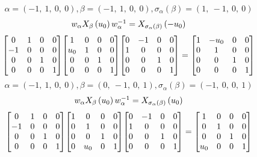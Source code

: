 \documentclass[11pt]{article}
\theoremstyle{definition}
\begin{document}
\[
\alpha = \left( -1, \  1, \  0, \  0\right), \beta = \left( -1, \  1, \  0, \  0\right), \sigma_{\alpha}(\beta) = \left( 1, \  -1, \  0, \  0\right)
\]
\[
\scaletoalign{\textwidth}{w_{\alpha} X_{\beta}\left(u_{0}\right) w_{\alpha}^{-1} = X_{\sigma_{\alpha}\left(\beta\right)}\left(- u_{0}\right)}
\]
\[
\scaletoalign{\textwidth}{{\left[\begin{matrix}0 & 1 & 0 & 0\\-1 & 0 & 0 & 0\\0 & 0 & 1 & 0\\0 & 0 & 0 & 1\end{matrix}\right]} {\left[\begin{matrix}1 & 0 & 0 & 0\\u_{0} & 1 & 0 & 0\\0 & 0 & 1 & 0\\0 & 0 & 0 & 1\end{matrix}\right]} {\left[\begin{matrix}0 & -1 & 0 & 0\\1 & 0 & 0 & 0\\0 & 0 & 1 & 0\\0 & 0 & 0 & 1\end{matrix}\right]} = {\left[\begin{matrix}1 & - u_{0} & 0 & 0\\0 & 1 & 0 & 0\\0 & 0 & 1 & 0\\0 & 0 & 0 & 1\end{matrix}\right]}}
\]
\[
\alpha = \left( -1, \  1, \  0, \  0\right), \beta = \left( 0, \  -1, \  0, \  1\right), \sigma_{\alpha}(\beta) = \left( -1, \  0, \  0, \  1\right)
\]
\[
\scaletoalign{\textwidth}{w_{\alpha} X_{\beta}\left(u_{0}\right) w_{\alpha}^{-1} = X_{\sigma_{\alpha}\left(\beta\right)}\left(u_{0}\right)}
\]
\[
\scaletoalign{\textwidth}{{\left[\begin{matrix}0 & 1 & 0 & 0\\-1 & 0 & 0 & 0\\0 & 0 & 1 & 0\\0 & 0 & 0 & 1\end{matrix}\right]} {\left[\begin{matrix}1 & 0 & 0 & 0\\0 & 1 & 0 & 0\\0 & 0 & 1 & 0\\0 & u_{0} & 0 & 1\end{matrix}\right]} {\left[\begin{matrix}0 & -1 & 0 & 0\\1 & 0 & 0 & 0\\0 & 0 & 1 & 0\\0 & 0 & 0 & 1\end{matrix}\right]} = {\left[\begin{matrix}1 & 0 & 0 & 0\\0 & 1 & 0 & 0\\0 & 0 & 1 & 0\\u_{0} & 0 & 0 & 1\end{matrix}\right]}}
\]
\end{document}
